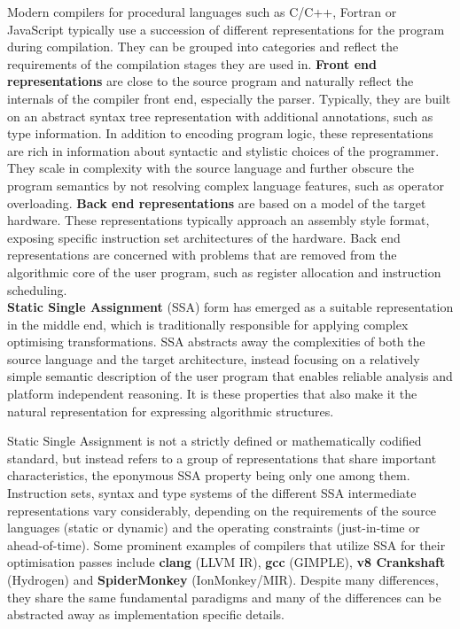     Modern compilers for procedural languages such as
    C/C++, Fortran or JavaScript typically use a succession of different
    representations for the program during compilation.
    They can be grouped into categories and reflect the requirements of
    the compilation stages they are used in.
    \linebreak
    {\bf Front end representations} are close to the source program and
    naturally reflect the internals of the compiler front end, especially the
    parser.
    Typically, they are built on an abstract syntax tree representation with
    additional annotations, such as type information.
    In addition to encoding program logic, these representations are rich in
    information about syntactic and  stylistic choices of the programmer.
    They scale in complexity with the source language and further obscure the
    program semantics by not resolving complex language features, such as
    operator overloading.
    \linebreak
    {\bf Back end representations} are based on a model of the target hardware.
    These representations typically approach an assembly style format,
    exposing specific instruction set architectures of the hardware.
    Back end representations are concerned with problems that are removed from
    the algorithmic core of the user program, such as register allocation and
    instruction scheduling.
    \\
    {\bf Static Single Assignment} (SSA) form has emerged as a suitable
    representation in the middle end, which is traditionally responsible for
    applying complex optimising transformations.
    SSA abstracts away the complexities of both the source language and the
    target architecture, instead focusing on a relatively simple semantic
    description of the user program that enables reliable analysis and platform
    independent reasoning.
    It is these properties that also make it the natural representation for
    expressing algorithmic structures.

    Static Single Assignment is not a strictly defined or mathematically
    codified standard, but instead refers to a group of representations that
    share important characteristics,
    the eponymous SSA property being only one among them.
    Instruction sets, syntax and type systems of the different
    SSA intermediate representations vary considerably, depending on the
    requirements of the source languages (static or dynamic)
    and the operating constraints (just-in-time or ahead-of-time).
    Some prominent examples of compilers that utilize SSA for their
    optimisation passes include {\bf clang} (LLVM IR), {\bf gcc} (GIMPLE),
    {\bf v8 Crankshaft} (Hydrogen) and {\bf SpiderMonkey} (IonMonkey/MIR).
    Despite many differences, they share the same fundamental paradigms
    and many of the differences can be abstracted away as implementation
    specific details.

